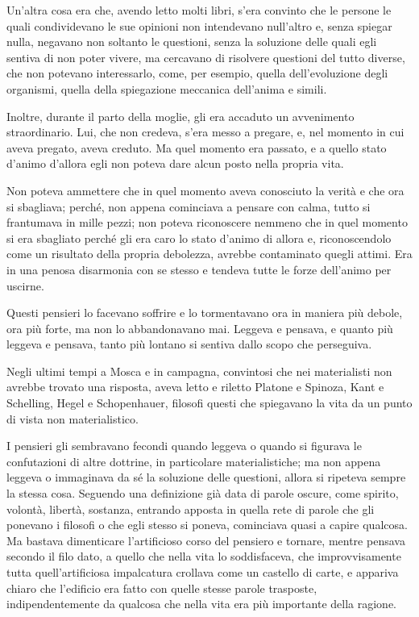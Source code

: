 Un'altra cosa era che, avendo letto molti libri, s'era convinto che le persone le quali condividevano le sue opinioni non intendevano null'altro e, senza spiegar nulla, negavano non soltanto le questioni, senza la soluzione delle quali egli sentiva di non poter vivere, ma cercavano di risolvere questioni del tutto diverse, che non potevano interessarlo, come, per esempio, quella dell'evoluzione degli organismi, quella della spiegazione meccanica dell'anima e simili. 

Inoltre, durante il parto della moglie, gli era accaduto un avvenimento straordinario. Lui, che non credeva, s'era messo a pregare, e, nel momento in cui aveva pregato, aveva creduto. Ma quel momento era passato, e a quello stato d'animo d'allora egli non poteva dare alcun posto nella propria vita. 

Non poteva ammettere che in quel momento aveva conosciuto la verità e che ora si sbagliava; perché, non appena cominciava a pensare con calma, tutto si frantumava in mille pezzi; non poteva riconoscere nemmeno che in quel momento si era sbagliato perché gli era caro lo stato d'animo di allora e, riconoscendolo come un risultato della propria debolezza, avrebbe contaminato quegli attimi. Era in una penosa disarmonia con se stesso e tendeva tutte le forze dell'animo per uscirne. 

Questi pensieri lo facevano soffrire e lo tormentavano ora in maniera più debole, ora più forte, ma non lo abbandonavano mai. Leggeva e pensava, e quanto più leggeva e pensava, tanto più lontano si sentiva dallo scopo che perseguiva. 

Negli ultimi tempi a Mosca e in campagna, convintosi che nei materialisti non avrebbe trovato una risposta, aveva letto e riletto Platone e Spinoza, Kant e Schelling, Hegel e Schopenhauer, filosofi questi che spiegavano la vita da un punto di vista non materialistico. 

I pensieri gli sembravano fecondi quando leggeva o quando si figurava le confutazioni di altre dottrine, in particolare materialistiche; ma non appena leggeva o immaginava da sé la soluzione delle questioni, allora si ripeteva sempre la stessa cosa. Seguendo una definizione già data di parole oscure, come spirito, volontà, libertà, sostanza, entrando apposta in quella rete di parole che gli ponevano i filosofi o che egli stesso si poneva, cominciava quasi a capire qualcosa. Ma bastava dimenticare l'artificioso corso del pensiero e tornare, mentre pensava secondo il filo dato, a quello che nella vita lo soddisfaceva, che improvvisamente tutta quell'artificiosa impalcatura crollava come un castello di carte, e appariva chiaro che l'edificio era fatto con quelle stesse parole trasposte, indipendentemente da qualcosa che nella vita era più importante della ragione. 

